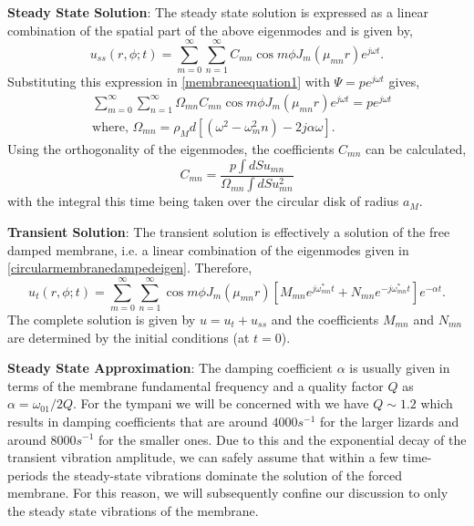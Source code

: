 \noindent\textbf{Steady State Solution}: The steady state solution is expressed as a linear combination of the spatial part
of the above eigenmodes and is given by,
\begin{equation}\label{membraness1}
 u_{ss}(r,\phi ;t)=\displaystyle\sum^\infty_{m=0}\sum^\infty_{n=1} C_{mn}\cos m\phi J_m(\mu_{mn} r)e^{j\omega t}.
\end{equation}
Substituting this expression in \eqref{membraneequation1} with $\Psi=pe^{j\omega t}$ gives,
\begin{align}
 &\displaystyle\sum^\infty_{m=0}\sum^\infty_{n=1} \Omega_{mn}C_{mn}\cos m\phi J_m(\mu_{mn} r)e^{j\omega t}=pe^{j\omega t}\label{membraness2}\\
 &\text{where,  }\Omega_{mn}=\rho_M d \left[(\omega^2-\omega^2_mn)-2j\alpha\omega\right]\label{omegafirstdef}.
\end{align}
Using the orthogonality of the eigenmodes, the coefficients $C_{mn}$ can be calculated,
\begin{equation}\label{sscoeffs}
 C_{mn}=\frac{p\int dS u_{mn}}{\Omega_{mn}\int dS u^2_{mn}}
\end{equation}
with the integral this time being taken over the circular disk of radius $a_M$.

\vspace{\baselineskip}
\noindent\textbf{Transient Solution}: The transient solution is effectively a solution of the free damped membrane, i.e. a linear 
combination of the eigenmodes given in \eqref{circularmembranedampedeigen}. Therefore,
\begin{equation}\label{membranet1}
 u_t(r,\phi;t)=\displaystyle\sum^\infty_{m=0}\sum^\infty_{n=1}\cos m\phi J_m(\mu_{mn} r)\left[M_{mn}e^{j\omega_{mn}^* t}+N_{mn}e^{-j\omega_{mn}^* t}\right]e^{-\alpha t}.
\end{equation}
The complete solution is given by $u=u_t+u_{ss}$ and the coefficients $M_{mn}$ and $N_{mn}$ are determined by the initial conditions (at $t=0$).

\vspace{\baselineskip}
\textbf{Steady State Approximation}: The damping coefficient $\alpha$ is usually given in terms of the membrane fundamental frequency and a quality factor $Q$ as $\alpha=\omega_{01}/2Q$. For the tympani
we will be concerned with we have $Q\sim 1.2$ which results in damping coefficients that are around $4000s^{-1} $ for the larger lizards and around $8000s^{-1}$ for the smaller ones. 
Due to this and the exponential decay of the transient vibration amplitude, we can safely assume that within a few time-periods the steady-state vibrations dominate the solution of the
forced membrane. For this reason, we will subsequently confine our discussion to only the steady state vibrations of the membrane.
